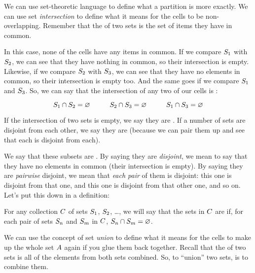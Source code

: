 \documentclass[../../../main.tex]{subfiles}
\begin{document}
We can use set-theoretic language to define what a partition is more exactly. We can use set \emph{intersection} to define what it means for the cells to be non-overlapping. Remember that the  of two sets is the set of items they have in common. 

In this case, none of the cells have any items in common. If we compare $S_{1}$ with $S_{2}$, we can see that they have nothing in common, so their intersection is empty. Likewise, if we compare $S_{2}$ with $S_{3}$, we can see that they have no elements in common, so their intersection is empty too. And the same goes if we compare $S_{1}$ and $S_{3}$. So, we can say that the intersection of any two of our cells is :

\begin{equation*}
  \set{S}_{1} \cap \set{S}_{2} = \emptyset/ \hskip 1cm
  \set{S}_{2} \cap \set{S}_{3} = \emptyset/ \hskip 1cm
  \set{S}_{1} \cap \set{S}_{3} = \emptyset/
\end{equation*}

\begin{terminology}
  If the intersection of two sets is empty, we say they are . If a number of sets are disjoint from each other, we say they are  (because we can pair them up and see that each is disjoint from each). 
\end{terminology}

We say that these subsets are . By saying they are \emph{disjoint}, we mean to say that they have no elements in common (their intersection is empty). By saying they are \emph{pairwise} disjoint, we mean that \emph{each pair} of them is disjoint: this one is disjoint from that one, and this one is disjoint from that other one, and so on. Let's put this down in a definition:

\begin{fdefinition}
  For any collection $C$ of sets $S_{1}$, $S_{2}$, \ldots, we will say that the sets in $C$ are  if, for each pair of sets $S_{n}$ and $S_{m}$ in $C$, $\set{S}_{n} \cap \set{S}_{m} = \emptyset/$.
\end{fdefinition}

We can use the concept of set \emph{union} to define what it means for the cells to make up the whole set $A$ again if you glue them back together. Recall that the  of two sets is all of the elements from both sets combined. So, to ``union'' two sets, is to combine them.
\end{document}
